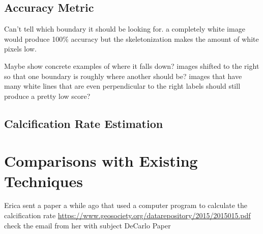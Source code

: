 \subsection{Accuracy Metric}

Can't tell which boundary it should be looking for. a completely white image would produce 100\% accuracy but the skeletonization makes the amount of white pixels low.

Maybe show concrete examples of where it falls down? images shifted to the right so that one boundary is roughly where another should be? images that have many white lines that are even perpendicular to the right labels should still produce a pretty low score?

\subsection{Calcification Rate Estimation}

\section{Comparisons with Existing Techniques}

Erica sent a paper a while ago that used a computer program to calculate the calcification rate  \url{https://www.geosociety.org/datarepository/2015/2015015.pdf} check the email from her with subject DeCarlo Paper




